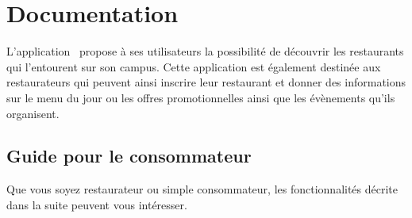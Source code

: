 \section{Documentation}

L'application \appname~propose à ses utilisateurs la possibilité de découvrir les restaurants qui l'entourent sur son campus. Cette application est également destinée aux restaurateurs qui peuvent ainsi inscrire leur restaurant et donner des informations sur le menu du jour ou les offres promotionnelles ainsi que les évènements qu'ils organisent.


\subsection{Guide pour le consommateur}

Que vous soyez restaurateur ou simple consommateur, les fonctionnalités décrite dans la suite peuvent vous intéresser. \\

